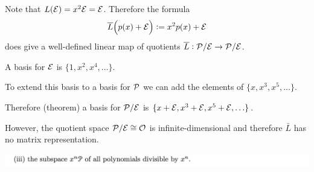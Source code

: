 \documentclass[12pt]{article}
\begin{document}
Note that $L(\mathcal E) = x^2\mathcal E = \mathcal E$. Therefore the formula
\begin{align*}
  \overline L\Big(p(x) + \mathcal E\Big) := x^2p(x) + \mathcal E
\end{align*}
does give a well-defined linear map of quotients $\overline L:\mathcal P/\mathcal E \to \mathcal P/\mathcal E$.

A basis for $\mathcal E$ is $\{1, x^2, x^4, \ldots\}$.

To extend this basis to a basis for $\mathcal P$ we can add the elements of $\{x, x^3, x^5, \ldots\}$.

Therefore (theorem) a basis for $\mathcal P/\mathcal E$ is $\{x + \mathcal E, x^3 + \mathcal E, x^5 + \mathcal E, \ldots\}$.

However, the quotient space $\mathcal P/\mathcal E \cong \mathcal O$ is infinite-dimensional and therefore
$\bar L$ has no matrix representation.




\begin{mdframed}
\includegraphics[width=400pt]{img/linear-algebra-a0-2-2-3.png}
\end{mdframed}
\end{document}

